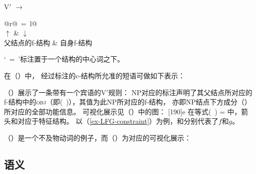 \ea
V$'$ $\to$ \begin{tabular}[t]{@{}r@{~=~}l@{}}
           \\ %
           $\uparrow$ &  $\downarrow$\\ 
           父结点的f-结构 & 自身f-结构\\
           \end{tabular}
\z
`\up~=~\down'标注置于一个结构的中心词之下。

在（）中，
经过标注的c-结构所允准的短语可做如下表示：
\ea
{}%
\hspace*{3em}%
\z

\noindent
（）展示了一条带有一个宾语的V$'$规则：
\ea
{}
\z
%
NP对应的标注声明了其父结点所对应的f-结构中的\textsc{obj}（即\mbox{(\up\ \lfgobj)}），其值为此NP所对应的f-结构，
亦即NP结点下方成分（\down）所对应的全部功能信息。
可视化展示见（）中的图：
\ea
{}%
\hspace*{3em}%
[190]{e}
\z
在等式(\up\ \lfgobj) = \down{}中，箭头\up 和\down 对应于特征结构。
以（\ref{ex-LFG-constraint}）为例，\up 和\down 分别代表了$f$和$g$。

（）是一个不及物动词的例子，而（）为对应的可视化展示：

\ea
{}
\z

\ea
{}
\hspace*{4em}
\z 
{}

\subsection{语义}
\label{lfg-semantics}
\label{glue-semantics}

